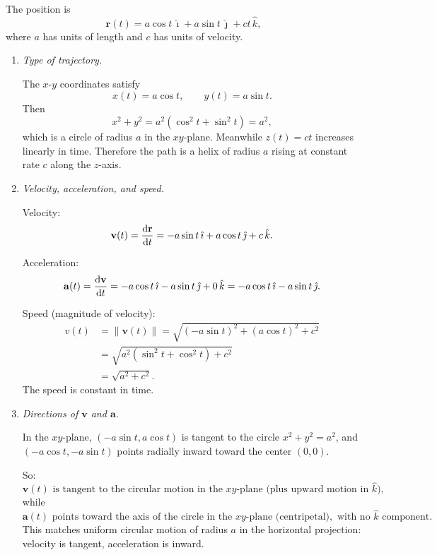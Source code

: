 \documentclass[12pt]{article}
\begin{document}
\begin{enumerate}
The position is
\[
  \mathbf{r}(t) = a\cos t \,\hat{\imath} + a\sin t \,\hat{\jmath} + ct \,\hat{k},
\]
where $a$ has units of length and $c$ has units of velocity.

\begin{enumerate}
    \item \textit{Type of trajectory.}

    The $x$-$y$ coordinates satisfy
    \[
      x(t)=a\cos t, \qquad y(t)=a\sin t.
    \]
    Then
    \[
      x^2 + y^2 = a^2(\cos^2 t + \sin^2 t)=a^2,
    \]
    which is a circle of radius $a$ in the $xy$-plane. Meanwhile $z(t)=ct$ increases linearly in time. Therefore the path is a helix of radius $a$ rising at constant rate $c$ along the $z$-axis.

    \item \textit{Velocity, acceleration, and speed.}

    Velocity:
    \[
      \mathbf{v}(t) = \dv{\mathbf{r}}{t}
      = -a\sin t \,\hat{\imath} + a\cos t \,\hat{\jmath} + c\,\hat{k}.
    \]

    Acceleration:
    \[
      \mathbf{a}(t) = \dv{\mathbf{v}}{t}
      = -a\cos t \,\hat{\imath} - a\sin t \,\hat{\jmath} + 0\,\hat{k}
      = -a\cos t \,\hat{\imath} - a\sin t \,\hat{\jmath}.
    \]

    Speed (magnitude of velocity):
    \begin{align*}
      v(t) &= \|\mathbf{v}(t)\|
      = \sqrt{(-a\sin t)^2 + (a\cos t)^2 + c^2} \\
      &= \sqrt{a^2(\sin^2 t + \cos^2 t) + c^2} \\
      &= \sqrt{a^2 + c^2}.
    \end{align*}
    The speed is constant in time.

    \item \textit{Directions of $\mathbf{v}$ and $\mathbf{a}$.}

    In the $xy$-plane, $(-a\sin t, a\cos t)$ is tangent to the circle $x^2+y^2=a^2$, and $(-a\cos t, -a\sin t)$ points radially inward toward the center $(0,0)$.

    So:
    \[
      \mathbf{v}(t) \text{ is tangent to the circular motion in the } xy\text{-plane (plus upward motion in } \hat{k}),
    \]
    while
    \[
      \mathbf{a}(t) \text{ points toward the axis of the circle in the } xy\text{-plane (centripetal)}, \text{ with no }\hat{k}\text{ component.}
    \]
    This matches uniform circular motion of radius $a$ in the horizontal projection: velocity is tangent, acceleration is inward.


\end{enumerate}
\end{enumerate}
\end{document}
